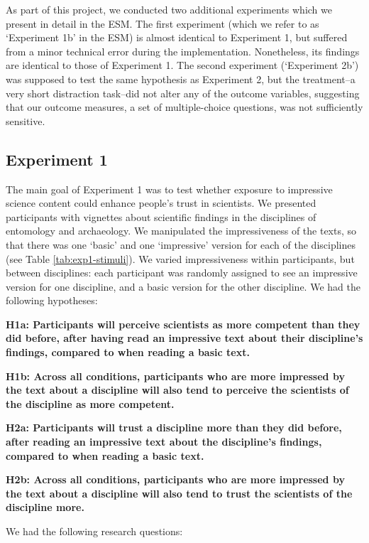 \documentclass[
  doc,floatsintext]{apa6}
\begin{document}
As part of this project, we conducted two additional experiments which we present in detail in the ESM. The first experiment (which we refer to as `Experiment 1b' in the ESM) is almost identical to Experiment 1, but suffered from a minor technical error during the implementation. Nonetheless, its findings are identical to those of Experiment 1. The second experiment (`Experiment 2b') was supposed to test the same hypothesis as Experiment 2, but the treatment--a very short distraction task--did not alter any of the outcome variables, suggesting that our outcome measures, a set of multiple-choice questions, was not sufficiently sensitive.

\subsection{Experiment 1}\label{experiment-1}

The main goal of Experiment 1 was to test whether exposure to impressive science content could enhance people's trust in scientists. We presented participants with vignettes about scientific findings in the disciplines of entomology and archaeology. We manipulated the impressiveness of the texts, so that there was one `basic' and one `impressive' version for each of the disciplines (see Table \ref{tab:exp1-stimuli}). We varied impressiveness within participants, but between disciplines: each participant was randomly assigned to see an impressive version for one discipline, and a basic version for the other discipline. We had the following hypotheses:

\textbf{H1a: Participants will perceive scientists as more competent than they did before, after having read an impressive text about their discipline's findings, compared to when reading a basic text.}

\textbf{H1b: Across all conditions, participants who are more impressed by the text about a discipline will also tend to perceive the scientists of the discipline as more competent.}

\textbf{H2a: Participants will trust a discipline more than they did before, after reading an impressive text about the discipline's findings, compared to when reading a basic text.}

\textbf{H2b: Across all conditions, participants who are more impressed by the text about a discipline will also tend to trust the scientists of the discipline more.}

We had the following research questions:
\end{document}
